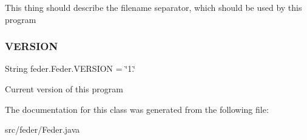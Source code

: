 This thing should describe the filename separator, which should be used by this program \mbox{\label{classfeder_1_1Feder_a7d76dfb8e1cf17ae7b8183c4f0e9c303}} 
\subsubsection{\texorpdfstring{V\+E\+R\+S\+I\+ON}{VERSION}}
{\footnotesize\ttfamily String feder.\+Feder.\+V\+E\+R\+S\+I\+ON = \char`\"{}1.\char`\"{}\hspace{0.3cm}{\ttfamily [static]}}

Current version of this program 

The documentation for this class was generated from the following file\+:\begin{DoxyCompactItemize}
\item 
src/feder/Feder.\+java\end{DoxyCompactItemize}
